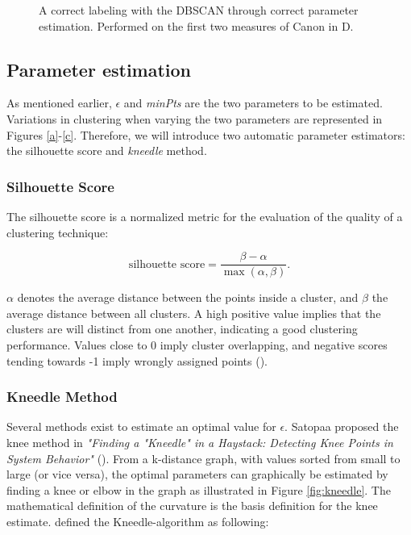 \begin{figure}[h]
\centering

\vspace{0.1cm}
\caption{A correct labeling with the DBSCAN through correct parameter estimation. Performed on the first two measures of Canon in D.}
\label{clusteringRoot} 
\end{figure}

\subsection{Parameter estimation}

As mentioned earlier, $\epsilon$ and \textit{minPts} are the two parameters to be estimated. Variations in clustering when varying the two parameters are represented in Figures \ref{a}-\ref{c}. Therefore, we will introduce two automatic parameter estimators: the silhouette score and \textit{kneedle} method.


\subsubsection{Silhouette Score}
The silhouette score is a normalized metric for the evaluation of the quality of a clustering technique:

\begin{equation}
\text{silhouette score} = \frac{\beta-\alpha}{\max(\alpha,\beta)}.
\end{equation}

$\alpha$ denotes the average distance between the points inside a cluster, and $\beta$ the average distance between all clusters. A high positive value implies that the clusters are will distinct from one another, indicating a good clustering performance. Values close to 0 imply cluster overlapping, and negative scores tending towards -1 imply wrongly assigned points (\cite{rousseeuw_silhouettes_1987}).

\subsubsection{Kneedle Method}


Several methods exist to estimate an optimal value for $\epsilon$. Satopaa proposed the knee method in \textit{"Finding a "Kneedle" in a Haystack: Detecting Knee Points in System Behavior"} (\cite{satopaa_finding_2011}). From a k-distance graph, with values sorted from small to large (or vice versa), the optimal parameters can graphically be estimated by finding a knee or elbow in the graph as illustrated in Figure \ref{fig:kneedle}. 
The mathematical definition of the curvature is the basis definition for the knee estimate. \textcite{satopaa_finding_2011} defined the Kneedle-algorithm as following:

